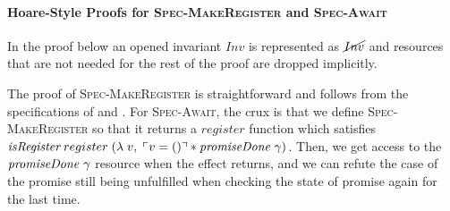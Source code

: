 \paragraph*{Hoare-Style Proofs for \textsc{Spec-MakeRegister} and \textsc{Spec-Await}}

In the proof below an opened invariant \(Inv\) is represented as \(\cancel{Inv}\) and resources that are not needed for the rest of the proof are dropped implicitly.

The proof of \textsc{Spec-MakeRegister} is straightforward and follows from the specifications of  and .
For \textsc{Spec-Await}, the crux is that we define \textsc{Spec-MakeRegister} so that it returns a \(register\) function which satisfies \(\emph{isRegister}{}\; register\; (\lambda\; v,\; \ulcorner v = () \urcorner \ast \emph{promiseDone}~\gamma{})\).
Then, we get access to the \(\emph{promiseDone}~\gamma{}\) resource when the \esuspend{} effect returns, and we can refute the case of the promise still being unfulfilled when checking the state of promise again for the last time.

